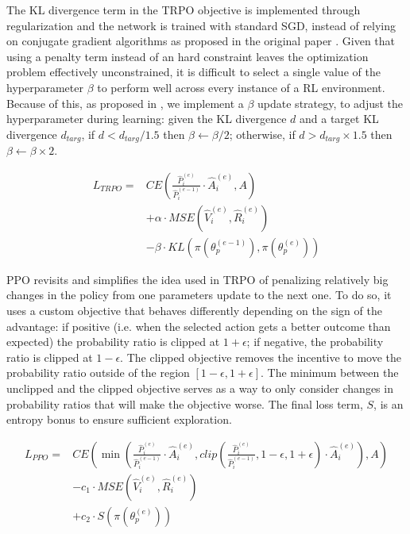 \documentclass{article}
\begin{document}
The KL divergence term in the TRPO objective is implemented through regularization and the network is trained with standard SGD, instead of relying on conjugate gradient algorithms as proposed in the original paper \cite{trpo}. Given that using a penalty term instead of an hard constraint leaves the optimization problem effectively unconstrained, it is difficult to select a single value of the hyperparameter $\beta$ to perform well across every instance of a RL environment. Because of this, as proposed in \cite{ppo}, we implement a $\beta$ update strategy, to adjust the hyperparameter during learning: given the KL divergence $d$ and a target KL divergence $d_{targ}$, if $d<d_{targ}/1.5$ then $\beta\leftarrow\beta/2$; otherwise, if $d>d_{targ}\times 1.5$ then $\beta\leftarrow\beta\times 2$.

\begin{equation}
  \label{eq:trpo}
  \begin{aligned}
    L_{TRPO}={} & CE\left(\frac{\hat{P}_i^{(e)}}{\hat{P}_i^{(e-1)}}\cdot \hat{A}_i^{(e)}, A\right) \\
    & + \alpha\cdot MSE\left(\hat{V}_i^{(e)}, \hat{R}_i^{(e)}\right) \\
    & - \beta\cdot KL\left(\pi(\theta_p^{(e-1)}), \pi(\theta_p^{(e)})\right)
  \end{aligned}
\end{equation}

PPO revisits and simplifies the idea used in TRPO of penalizing relatively big changes in the policy from one parameters update to the next one. To do so, it uses a custom objective that behaves differently depending on the sign of the advantage: if positive (i.e. when the selected action gets a better outcome than expected) the probability ratio is clipped at $1+\epsilon$; if negative, the probability ratio is clipped at $1-\epsilon$. The clipped objective removes the incentive to move the probability ratio outside of the region $[1-\epsilon, 1+\epsilon]$. The minimum between the unclipped and the clipped objective serves as a way to only consider changes in probability ratios that will make the objective worse. The final loss term, $S$, is an entropy bonus to ensure sufficient exploration.

\begin{equation}
  \label{eq:ppo}
  \begin{aligned}
    L_{PPO}={} & CE\left(\min\left(\frac{\hat{P}_i^{(e)}}{\hat{P}_i^{(e-1)}}\cdot \hat{A}_i^{(e)}, clip\left(\frac{\hat{P}_i^{(e)}}{\hat{P}_i^{(e-1)}}, 1-\epsilon, 1+\epsilon\right)\cdot \hat{A}_i^{(e)}\right), A\right) \\
    & - c_1\cdot MSE\left(\hat{V}_i^{(e)}, \hat{R}_i^{(e)}\right) \\
    & + c_2\cdot S\left(\pi(\theta_p^{(e)})\right) \\
  \end{aligned}
\end{equation}
\end{document}
